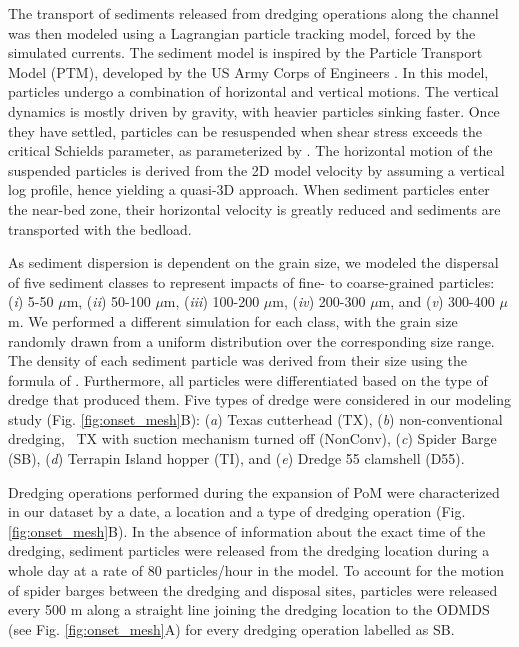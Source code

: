 The transport of sediments released from dredging operations along the channel was then modeled using a Lagrangian particle tracking model, forced by the simulated currents. The sediment model is inspired by the Particle Transport Model (PTM), developed by the US Army Corps of Engineers \citep{macdonald2006ptm}. In this model, particles undergo a combination of horizontal and vertical motions. The vertical dynamics is mostly driven by gravity, with heavier particles sinking faster. Once they have settled, particles can be resuspended when shear stress exceeds   the critical Schields parameter, as parameterized by \cite{soulsby1997threshold}. The horizontal motion of the suspended particles is derived from the 2D model velocity by assuming a vertical log profile, hence yielding a quasi-3D approach. When sediment particles enter the near-bed zone, their horizontal velocity is greatly reduced and sediments are transported with the bedload.   

As sediment dispersion is dependent on the grain size, we modeled the dispersal of five sediment classes to represent impacts of fine- to coarse-grained particles: (\textit{i}) 5-50 $\mu$m, (\textit{ii}) 50-100 $\mu$m, (\textit{iii}) 100-200 $\mu$m, (\textit{iv}) 200-300 $\mu$m, and (\textit{v}) 300-400 $\mu$m. We performed a  different simulation for each class, with the grain size randomly drawn from a uniform distribution over the corresponding size range. The density of each sediment particle was derived from their size using the formula of \cite{hamilton1982sound}. Furthermore, all particles were differentiated based on the type of dredge that produced them. Five types of dredge were considered in our modeling study (Fig. \ref{fig:onset_mesh}B): (\textit{a}) Texas cutterhead (TX), (\textit{b}) non-conventional dredging, \ie~TX with suction mechanism turned off (NonConv), (\textit{c}) Spider Barge (SB), (\textit{d}) Terrapin Island hopper (TI), and (\textit{e}) Dredge 55 clamshell (D55).

Dredging operations performed during the expansion of PoM were characterized in our dataset by a date, a location and  a type of dredging operation (Fig. \ref{fig:onset_mesh}B). In the absence of information about the exact time of the dredging, sediment particles were released from the dredging location during a whole day at a rate of 80 particles/hour in the model. To account for the motion of spider barges between the dredging and disposal sites, particles were released every 500 m along a straight line joining the dredging location to the ODMDS (see Fig. \ref{fig:onset_mesh}A) for every dredging operation labelled as SB.

